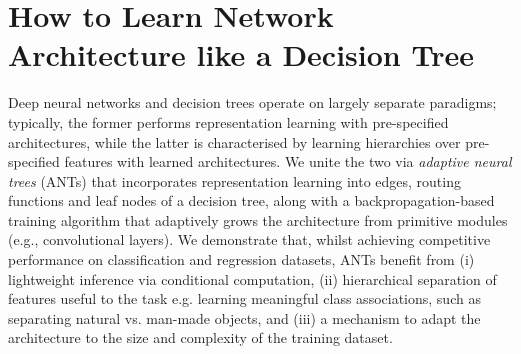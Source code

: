 %
%
\chapter{How to Learn Network Architecture like a Decision Tree}
\label{chapter:ant}
Deep neural networks and decision trees operate on largely separate paradigms; typically, the former performs representation learning with pre-specified architectures, while the latter is characterised by learning hierarchies over pre-specified features with learned architectures. We unite the two via \emph{adaptive neural trees} (ANTs) that incorporates representation learning into edges, routing functions and leaf nodes of a decision tree, along with a backpropagation-based training algorithm that adaptively grows the architecture from primitive modules (e.g., convolutional layers). We demonstrate that, whilst achieving competitive performance on classification and regression datasets, ANTs benefit from (i) lightweight inference via conditional computation, (ii) hierarchical separation of features useful to the task e.g. learning meaningful class associations, such as separating natural vs. man-made objects, and (iii) a mechanism to adapt the architecture to the size and complexity of the training dataset.

%







%
%

% 